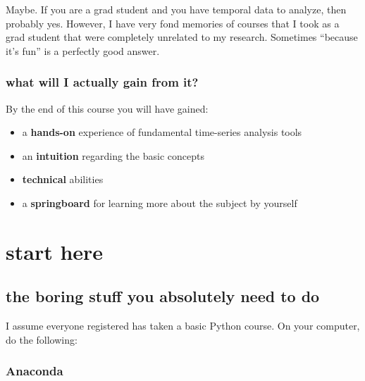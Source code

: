 \documentclass[
  letterpaper,
  DIV=11,
  numbers=noendperiod,
  oneside]{scrreprt}
\providecommand{\tightlist}{%
  \setlength{\itemsep}{0pt}\setlength{\parskip}{0pt}}\usepackage{longtable,booktabs,array}
\begin{document}

Maybe. If you are a grad student and you have temporal data to analyze,
then probably yes. However, I have very fond memories of courses that I
took as a grad student that were completely unrelated to my research.
Sometimes ``because it's fun'' is a perfectly good answer.

\hypertarget{what-will-i-actually-gain-from-it}{%
\section*{\texorpdfstring{what will I \textbf{actually} gain from
it?}{what will I actually gain from it?}}\label{what-will-i-actually-gain-from-it}}


By the end of this course you will have gained:

\begin{itemize}
\tightlist
\item
  a \textbf{hands-on} experience of fundamental time-series analysis
  tools
\item
  an \textbf{intuition} regarding the basic concepts
\item
  \textbf{technical} abilities
\item
  a \textbf{springboard} for learning more about the subject by yourself
\end{itemize}

\part{start here}

\hypertarget{the-boring-stuff-you-absolutely-need-to-do}{%
\chapter{the boring stuff you absolutely need to
do}\label{the-boring-stuff-you-absolutely-need-to-do}}

I assume everyone registered has taken a basic Python course. On your
computer, do the following:

\hypertarget{anaconda}{%
\section{Anaconda}\label{anaconda}}
\end{document}
